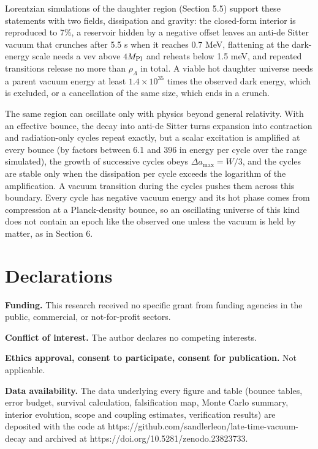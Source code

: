 \documentclass[11pt,a4paper]{article}
\begin{document}
Lorentzian simulations of the daughter region (Section 5.5) support these statements with two fields, dissipation and gravity: the closed-form interior is reproduced to 7\%, a reservoir hidden by a negative offset leaves an anti-de Sitter vacuum that crunches after 5.5 s when it reaches 0.7 MeV, flattening at the dark-energy scale needs a vev above $4M_{\rm Pl}$ and reheats below 1.5 meV, and repeated transitions release no more than $\rho_\Lambda$ in total. A viable hot daughter universe needs a parent vacuum energy at least $1.4\times10^{35}$ times the observed dark energy, which is excluded, or a cancellation of the same size, which ends in a crunch.

The same region can oscillate only with physics beyond general relativity. With an effective bounce, the decay into anti-de Sitter turns expansion into contraction and radiation-only cycles repeat exactly, but a scalar excitation is amplified at every bounce (by factors between 6.1 and 396 in energy per cycle over the range simulated), the growth of successive cycles obeys $\Delta a_{\max}=W/3$, and the cycles are stable only when the dissipation per cycle exceeds the logarithm of the amplification. A vacuum transition during the cycles pushes them across this boundary. Every cycle has negative vacuum energy and its hot phase comes from compression at a Planck-density bounce, so an oscillating universe of this kind does not contain an epoch like the observed one unless the vacuum is held by matter, as in Section 6.

\section*{Declarations}
\noindent\textbf{Funding.} This research received no specific grant from funding agencies in the public, commercial, or not-for-profit sectors.

\noindent\textbf{Conflict of interest.} The author declares no competing interests.

\noindent\textbf{Ethics approval, consent to participate, consent for publication.} Not applicable.

\noindent\textbf{Data availability.} The data underlying every figure and table (bounce tables, error budget, survival calculation, falsification map, Monte Carlo summary, interior evolution, scope and coupling estimates, verification results) are deposited with the code at https://github.com/sandlerleon/late-time-vacuum-decay and archived at https://doi.org/10.5281/zenodo.23823733.
\end{document}
